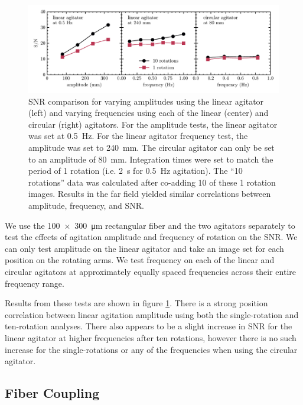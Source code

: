 \documentclass[twocolumn]{emulateapj}
\begin{document}
\begin{figure}[t]
\centering
	\includegraphics[width=\textwidth]{images/amp_freq_snr.pdf}
	\caption{SNR comparison for varying amplitudes using the linear agitator (left) and varying frequencies using each of the linear (center) and circular (right) agitators. For the amplitude tests, the linear agitator was set at \SI{0.5}{\hertz}. For the linear agitator frequency test, the amplitude was set to \SI{240}{\milli\meter}. The circular agitator can only be set to an amplitude of \SI{80}{\milli\meter}. Integration times were set to match the period of 1 rotation (i.e. \SI{2}{\second} for \SI{0.5}{\hertz} agitation). The ``10 rotations'' data was calculated after co-adding 10 of these 1 rotation images. Results in the far field yielded similar correlations between amplitude, frequency, and SNR.}
\label{fig:amp_freq_snr}
\end{figure}

We use the \SI{100x300}{\micro\meter} rectangular fiber and the two agitators separately to test the effects of agitation amplitude and frequency of rotation on the SNR. We can only test amplitude on the linear agitator and take an image set for each position on the rotating arms. We test frequency on each of the linear and circular agitators at approximately equally spaced frequencies across their entire frequency range.

Results from these tests are shown in figure \ref{fig:amp_freq_snr}. There is a strong position correlation between linear agitation amplitude using both the single-rotation and ten-rotation analyses. There also appears to be a slight increase in SNR for the linear agitator at higher frequencies after ten rotations, however there is no such increase for the single-rotations or any of the frequencies when using the circular agitator.

\subsection{Fiber Coupling}
\end{document}
